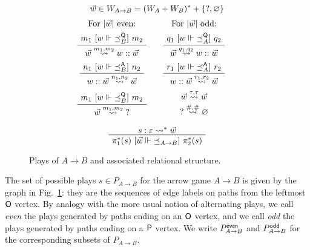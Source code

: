 \begin{figure}
  \vspace{1em}
  \noindent{}
  \[
    \vec{w} \in W_{A \rightarrow B} = (W_A + W_B)^* + \{ \mathsf{?} , \varnothing\}
  \]
  \vspace{1ex}
  \[
    \begin{array}{c@{\qquad}c@{\qquad}c}
      \text{For $\lvert \vec{w} \rvert$ even:} &
      \text{For $\lvert \vec{w} \rvert$ odd:}
      \\[1ex]
      \AxiomC{$m_1 \ifr{w \Vdash {\preceq}_B^\kw{Q}} m_2$}
      \UnaryInfC{$\vec{w} \stackrel{m_1, m_2}{\leadsto} w :: \vec{w}$}
      \DisplayProof
      &
      \AxiomC{$q_1 \ifr{w \Vdash {\preceq}_A^\kw{Q}} q_2$}
      \UnaryInfC{$\vec{w} \stackrel{q_1, q_2}{\leadsto} w :: \vec{w}$}
      \DisplayProof
      \\[3.3ex]
      \AxiomC{$n_1 \ifr{w \Vdash {\preceq}_B^\kw{A}} n_2$}
      \UnaryInfC{$w :: \vec{w} \stackrel{n_1, n_2}{\leadsto} \vec{w}$}
      \DisplayProof
      &
      \AxiomC{$r_1 \ifr{w \Vdash {\preceq}_A^\kw{A}} r_2$}
      \UnaryInfC{$w :: \vec{w} \stackrel{r_1, r_2}{\leadsto} \vec{w}$}
      \DisplayProof
      \\[3.3ex]
      \AxiomC{$m_1 \ifr{w \Vdash {\preceq}_B^\kw{Q}} m_2$}
      \UnaryInfC{$\vec{w} \stackrel{m_1, m_2}{\leadsto} \kw{?}$}
      \DisplayProof
      &
      \begin{array}{c}
        \vec{w} \stackrel{\tau, \tau}{\leadsto} \vec{w} \\[.5ex]
        \kw{?} \stackrel{\#,\#}{\leadsto} \varnothing
      \end{array}
    \end{array}
  \]

  \vspace{1em}
  \noindent{}
  \[
      \AxiomC{$s : \varepsilon \leadsto^* \vec{w}$}
      \UnaryInfC{$\pi_1^*(s)
         \ifr{\vec{w} \Vdash {\preceq}_{A \rightarrow B}}
         \pi_2^*(s)$}
      \DisplayProof
  \]
  \caption{Plays of $A \rightarrow B$ and associated relational structure.}
  \label{fig:plays}
\end{figure}

The set of possible plays $s \in P_{A \rightarrow B}$ for
the arrow game $A \rightarrow B$
is given by the graph in Fig.~\ref{fig:plays}:
they are the sequences of edge labels
on paths from the leftmost $ \mathsf{O} $ vertex.
By analogy with the more usual notion of alternating plays,
we call \emph{even}
the plays generated by paths ending on an $ \mathsf{O} $ vertex, and
we call \emph{odd}
the plays generated by paths ending on a $ \mathsf{P} $ vertex.
We write $P_{A \rightarrow B}^{ \mathsf{even} }$ and $P_{A \rightarrow B}^{ \mathsf{odd} }$
for the corresponding subsets of $P_{A \rightarrow B}$.

